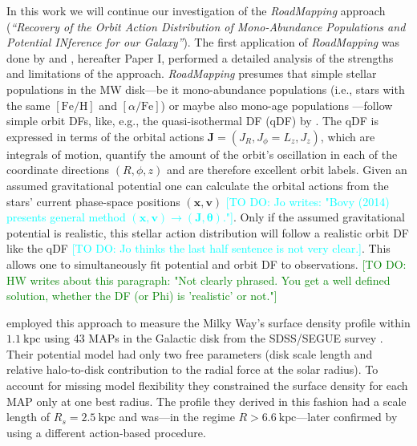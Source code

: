\documentclass[iop,revtex4,numberedappendix,appendixfloats]{emulateapj}
\newcommand{\vect}[1]{\boldsymbol{#1}}
\newcommand{\RM}{{\sl RoadMapping}}
\newcommand{\HW}[1]{\textcolor{Green}{#1}}
\newcommand{\Jo}[1]{\textcolor{Cyan}{#1}}
\begin{document}
In this work we will continue our investigation of the \RM{} approach (\emph{``Recovery of the Orbit Action Distribution of Mono-Abundance Populations and Potential INference for our Galaxy''}). The first application of \RM{} was done by \citet{2013ApJ...779..115B} and \citet{2016arXiv160508601T}, hereafter Paper I, performed a detailed analysis of the strengths and limitations of the approach. \RM{} presumes that simple stellar populations in the MW disk---be it mono-abundance populations \citep{2012ApJ...751..131B,2012ApJ...753..148B,2012ApJ...755..115B,2016ApJ...823...30B} (i.e., stars with the same $[\mathrm{Fe}/\mathrm{H}]$ and $[\alpha/\mathrm{Fe}]$) or maybe also mono-age populations \citep{2013ApJ...773...43B,2014MNRAS.442.2474M,2016MNRAS.456.3655M,2014A&A...572A..92M,2016ApJ...823..114N}---follow simple orbit DFs, like, e.g., the quasi-isothermal DF (qDF) by \citet{2011MNRAS.413.1889B} \citep{2013MNRAS.434..652T}. The qDF is expressed in terms of the orbital actions $\vect{J}=(J_R,J_\phi=L_z,J_z)$, which are integrals of motion, quantify the amount of the orbit's oscillation in each of the coordinate directions $(R,\phi,z)$ and are therefore excellent orbit labels. Given an assumed gravitational potential one can calculate the orbital actions from the stars' current phase-space positions $(\vect{x},\vect{v})$ \citep{2012MNRAS.426.1324B,2016MNRAS.457.2107S} \Jo{[TO DO: Jo writes: "Bovy (2014) presents general method $(\vect{x},\vect{v})\longrightarrow(\vect{J},\vect{\theta})$."]}. Only if the assumed gravitational potential is realistic, this stellar action distribution will follow a realistic orbit DF like the qDF \Jo{[TO DO: Jo thinks the last half sentence is not very clear.]}. This allows one to simultaneously fit potential and orbit DF to observations. \HW{[TO DO: HW writes about this paragraph: "Not clearly phrased. You get a well defined solution, whether the DF (or Phi) is 'realistic' or not."]}

\citet{2013ApJ...779..115B} employed this approach to measure the Milky Way's surface density profile within $1.1~\text{kpc}$ using 43 MAPs in the Galactic disk from the SDSS/SEGUE survey \citep{2009AJ....137.4377Y}. Their potential model had only two free parameters (disk scale length and relative halo-to-disk contribution to the radial force at the solar radius). To account for missing model flexibility they constrained the surface density for each MAP only at one best radius. The profile they derived in this fashion had a scale length of $R_s=2.5~\text{kpc}$ and was---in the regime $R>6.6~\text{kpc}$---later confirmed by \citet{2014MNRAS.445.3133P} using a different action-based procedure.
\end{document}
